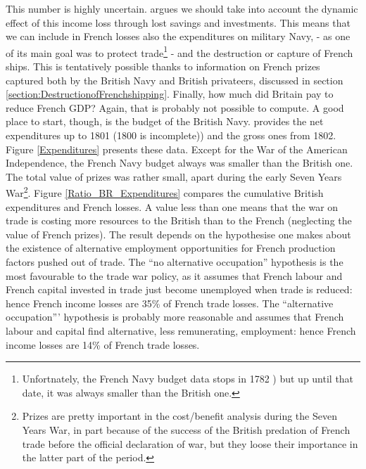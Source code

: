 \documentclass[12pt,a4paper,notitlepage,english]{article}
\begin{document}
This number is highly uncertain. \cite{Daudin2005} argues we should take into account the dynamic effect of this income loss through lost savings and investments. 
This means that we can include in French losses also the expenditures on military Navy, - as one of its main goal was to protect trade\footnote{Unfortnately, the French Navy budget data stops in 1782 \cite{Acerra1997, Villiers1997,Petitfils2015}) but up until that date, it was always smaller than the British one.} - and the destruction or capture of French ships. This is tentatively possible thanks to information on French prizes captured both by the British Navy and British privateers, discussed in section \ref{section:DestructionofFrenchshipping}.
Finally, how much did Britain pay to reduce French GDP? Again, that is probably not possible to compute. A good place to start, though, is the budget of the British Navy. \cite[pp. 570-587]{mitchell1988} provides the net expenditures up to 1801 (1800 is incomplete)) and the gross ones from 1802.
Figure \ref{Expenditures} presents these data. Except for the War of the American Independence, the French Navy budget always was smaller than the British one. The total value of prizes was rather small, apart during the early Seven Years War\footnote{Prizes are pretty important in the cost/benefit analysis during the Seven Years War, in part because of the success of the British predation of French trade before the official declaration of war, but they loose their importance in the latter part of the period.}.
Figure \ref{Ratio_BR_Expenditures} compares the cumulative British expenditures and French losses. A value less than one means that the war on trade is costing more resources to the British than to the French (neglecting the value of French prizes). 
The result depends on the hypothesise one makes about the existence of alternative employment opportunities for French production factors pushed out of trade. The ``no alternative occupation'' hypothesis is the most favourable to the trade war policy, as it assumes that French labour and French capital invested in trade just become unemployed when trade is reduced: hence French income losses are 35\% of French trade losses. The ``alternative occupation''' hypothesis is probably more reasonable and assumes that French labour and capital find alternative, less remunerating, employment: hence French income losses are 14\% of French trade losses.
\end{document}
